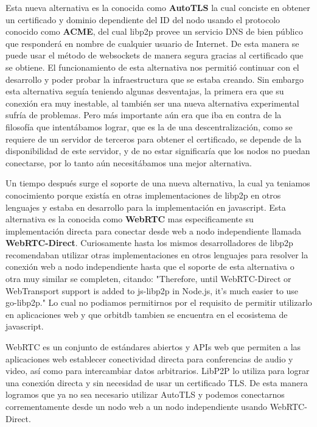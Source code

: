 Esta nueva alternativa es la conocida como \textbf{AutoTLS}\cite{autotls} la cual conciste en obtener un certificado y dominio dependiente del ID del nodo usando el protocolo conocido como \textbf{ACME}\cite{acme}, del cual libp2p provee un servicio DNS de bien público que responderá en nombre de cualquier usuario de Internet. De esta manera se puede usar el método de websockets de manera segura gracias al certificado que se obtiene. El funcionamiento de esta alternativa nos permitió continuar con el desarrollo y poder probar la infraestructura que se estaba creando. Sin embargo esta alternativa seguía teniendo algunas desventajas, la primera era que su conexión era muy inestable, al también ser una nueva alternativa experimental sufría de problemas. Pero más importante aún era que iba en contra de la filosofía que intentábamos lograr, que es la de una descentralización, como se requiere de un servidor de terceros para obtener el certificado, se depende de la disponibilidad de este servidor, y de no estar significaría que los nodos no puedan conectarse, por lo tanto aún necesitábamos una mejor alternativa.

Un tiempo después surge el soporte de una nueva alternativa, la cual ya teniamos conocimiento porque existía en otras implementaciones de libp2p en otros lenguajes y estaba en desarrollo para la implementación en javascript. Esta alternativa es la conocida como \textbf{WebRTC}\cite{webrtc} mas especificamente su implementación directa para conectar desde web a nodo independiente llamada \textbf{WebRTC-Direct}.  Curiosamente hasta los mismos desarrolladores de libp2p recomendaban utilizar otras implementaciones en otros lenguajes para resolver la conexión web a nodo independiente hasta que el soporte de esta alternativa o otra muy similar se completen, citando: "Therefore, until WebRTC-Direct or WebTransport support is added to js-libp2p in Node.js, it’s much easier to use go-libp2p."\cite{differences-nodejs-browser} Lo cual no podiamos permitirnos por el requisito de permitir utilizarlo en aplicaciones web y que orbitdb tambien se encuentra en el ecosistema de javascript.

WebRTC es un conjunto de estándares abiertos y APIs web que permiten a las aplicaciones web establecer conectividad directa para conferencias de audio y video, así como para intercambiar datos arbitrarios. LibP2P lo utiliza para lograr una conexión directa y sin necesidad de usar un certificado TLS. De esta manera logramos que ya no sea necesario utilizar AutoTLS y podemos conectarnos corrementamente desde un nodo web a un nodo independiente usando WebRTC-Direct.

